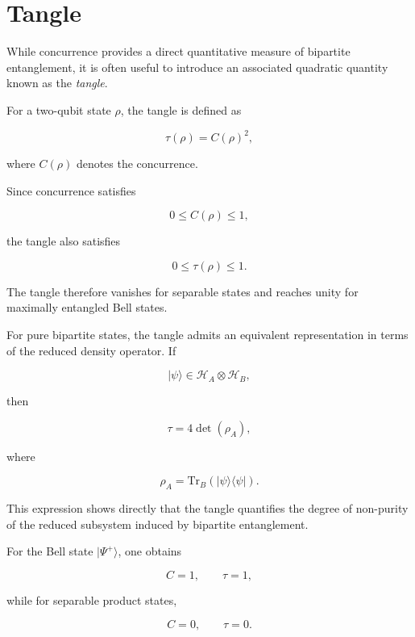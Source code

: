 \section{Tangle}

While concurrence provides a direct quantitative measure of bipartite entanglement, it is often useful to introduce an associated quadratic quantity known as the \emph{tangle}.

For a two-qubit state \( \rho \), the tangle is defined as

\begin{equation}
\tau(\rho)
=
C(\rho)^2,
\label{eq:tangle_definition}
\end{equation}

where \( C(\rho) \) denotes the concurrence.

\medskip

Since concurrence satisfies

\[
0
\leq
C(\rho)
\leq
1,
\]

the tangle also satisfies

\[
0
\leq
\tau(\rho)
\leq
1.
\]

The tangle therefore vanishes for separable states and reaches unity for maximally entangled Bell states.

\medskip

For pure bipartite states, the tangle admits an equivalent representation in terms of the reduced density operator. If

\[
|\psi\rangle
\in
\mathcal{H}_A
\otimes
\mathcal{H}_B,
\]

then

\begin{equation}
\tau
=
4
\det(\rho_A),
\label{eq:tangle_reduced_density_operator}
\end{equation}

where

\[
\rho_A
=
\mathrm{Tr}_B
\left(
|\psi\rangle
\langle\psi|
\right).
\]

This expression shows directly that the tangle quantifies the degree of non-purity of the reduced subsystem induced by bipartite entanglement.

\medskip

For the Bell state \( |\Psi^+\rangle \), one obtains

\[
C
=
1,
\qquad
\tau
=
1,
\]

while for separable product states,

\[
C
=
0,
\qquad
\tau
=
0.
\]

\medskip

